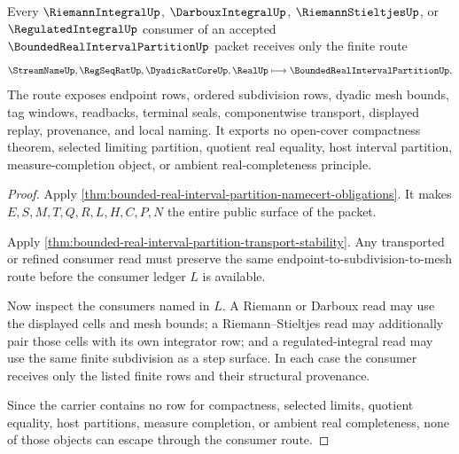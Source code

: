 \begin{theorem}
\label{thm:bounded-real-interval-partition-consumer-nonescape}
Every $\RiemannIntegralUp$, $\DarbouxIntegralUp$, $\RiemannStieltjesUp$, or $\RegulatedIntegralUp$ consumer of an accepted $\BoundedRealIntervalPartitionUp$ packet receives only the finite route
$$
\StreamNameUp,\RegSeqRatUp,\DyadicRatCoreUp,\RealUp
\longmapsto
\BoundedRealIntervalPartitionUp .
$$
The route exposes endpoint rows, ordered subdivision rows, dyadic mesh bounds, tag windows, readbacks, terminal seals, componentwise transport, displayed replay, provenance, and local naming. It exports no open-cover compactness theorem, selected limiting partition, quotient real equality, host interval partition, measure-completion object, or ambient real-completeness principle.
\end{theorem}
\begin{proof}
Apply \autoref{thm:bounded-real-interval-partition-namecert-obligations}. It makes $E,S,M,T,Q,R,L,H,C,P,N$ the entire public surface of the packet.

Apply \autoref{thm:bounded-real-interval-partition-transport-stability}. Any transported or refined consumer read must preserve the same endpoint-to-subdivision-to-mesh route before the consumer ledger $L$ is available.

Now inspect the consumers named in $L$. A Riemann or Darboux read may use the displayed cells and mesh bounds; a Riemann--Stieltjes read may additionally pair those cells with its own integrator row; and a regulated-integral read may use the same finite subdivision as a step surface. In each case the consumer receives only the listed finite rows and their structural provenance.

Since the carrier contains no row for compactness, selected limits, quotient equality, host partitions, measure completion, or ambient real completeness, none of those objects can escape through the consumer route.
\end{proof}


